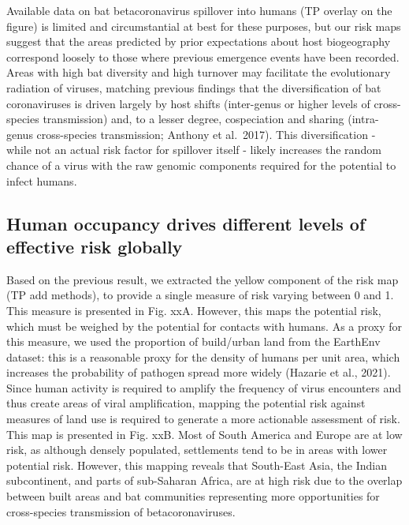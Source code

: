 \documentclass[10pt,oneside]{article}
\begin{document}
Available data on bat betacoronavirus spillover into humans (TP overlay
on the figure) is limited and circumstantial at best for these purposes,
but our risk maps suggest that the areas predicted by prior expectations
about host biogeography correspond loosely to those where previous
emergence events have been recorded. Areas with high bat diversity and
high turnover may facilitate the evolutionary radiation of viruses,
matching previous findings that the diversification of bat coronaviruses
is driven largely by host shifts (inter-genus or higher levels of
cross-species transmission) and, to a lesser degree, cospeciation and
sharing (intra-genus cross-species transmission; Anthony et al.~2017).
This diversification - while not an actual risk factor for spillover
itself - likely increases the random chance of a virus with the raw
genomic components required for the potential to infect humans.

\hypertarget{human-occupancy-drives-different-levels-of-effective-risk-globally}{%
\subsection{Human occupancy drives different levels of effective risk
globally}\label{human-occupancy-drives-different-levels-of-effective-risk-globally}}

Based on the previous result, we extracted the yellow component of the
risk map (TP add methods), to provide a single measure of risk varying
between 0 and 1. This measure is presented in Fig. xxA. However, this
maps the potential risk, which must be weighed by the potential for
contacts with humans. As a proxy for this measure, we used the
proportion of build/urban land from the EarthEnv dataset: this is a
reasonable proxy for the density of humans per unit area, which
increases the probability of pathogen spread more widely (Hazarie et
al., 2021). Since human activity is required to amplify the frequency of
virus encounters and thus create areas of viral amplification, mapping
the potential risk against measures of land use is required to generate
a more actionable assessment of risk. This map is presented in Fig. xxB.
Most of South America and Europe are at low risk, as although densely
populated, settlements tend to be in areas with lower potential risk.
However, this mapping reveals that South-East Asia, the Indian
subcontinent, and parts of sub-Saharan Africa, are at high risk due to
the overlap between built areas and bat communities representing more
opportunities for cross-species transmission of betacoronaviruses.
\end{document}

